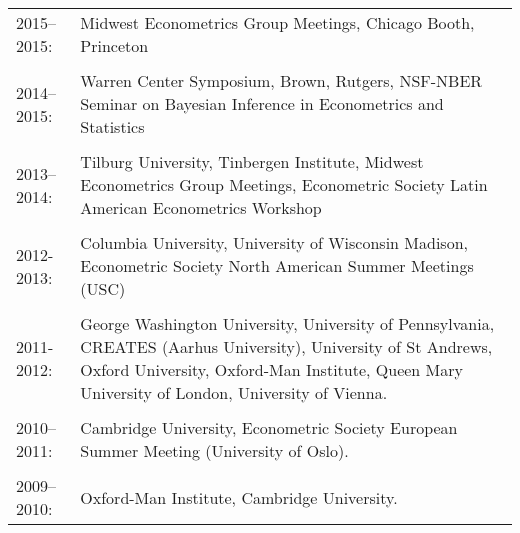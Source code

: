 \documentclass[line,overlapped]{myres}
\begin{document}
\begin{resume}
\begin{tabular}{p{2cm}p{12cm}}
2015--2015: & Midwest Econometrics Group Meetings, Chicago Booth, Princeton\\ \\
2014--2015: & Warren Center Symposium, Brown, Rutgers, NSF-NBER Seminar on Bayesian Inference in Econometrics and Statistics \\ \\
2013--2014: & Tilburg University, Tinbergen Institute, Midwest Econometrics Group Meetings, Econometric Society Latin American Econometrics Workshop\\ \\
2012-2013: & Columbia University, University of Wisconsin Madison, Econometric Society North American Summer Meetings (USC) \\\\
2011-2012: &  George Washington University, University of Pennsylvania, CREATES (Aarhus University), University of St Andrews, Oxford University, Oxford-Man Institute, Queen Mary University of London, University of Vienna. \\\\

2010--2011: &Cambridge University, Econometric Society European Summer Meeting (University of Oslo).\\\\

2009--2010: &Oxford-Man Institute, Cambridge University.
\end{tabular}



\end{resume}
\end{document}
